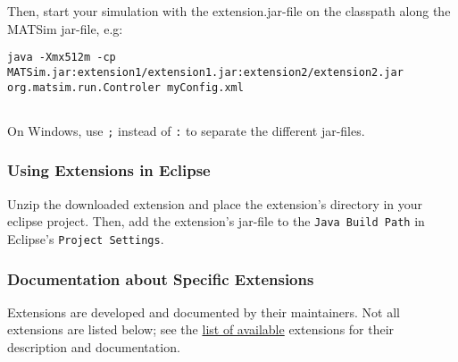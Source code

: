 Then, start your simulation with the extension.jar-file on the classpath along the MATSim jar-file, e.g:
\begin{verbatim}
java -Xmx512m -cp MATSim.jar:extension1/extension1.jar:extension2/extension2.jar org.matsim.run.Controler myConfig.xml


\end{verbatim}

On Windows, use 
\texttt{;} instead of 
\texttt{:} to separate the different jar-files.

\subsubsection{Using Extensions in Eclipse}

Unzip the downloaded extension and place the extension's directory in  your eclipse project. Then, add the extension's jar-file to the 
\texttt{Java Build Path} in Eclipse's 
\texttt{Project Settings}.

\subsubsection{Documentation about Specific Extensions}

Extensions are developed and documented by their maintainers. Not all extensions are listed below; see the \href{http://www.matsim.org/extensions}{list of available} extensions for their description and documentation.



\vfill\eject


\vfill\eject


\vfill\eject


\vfill\eject


\vfill\eject

